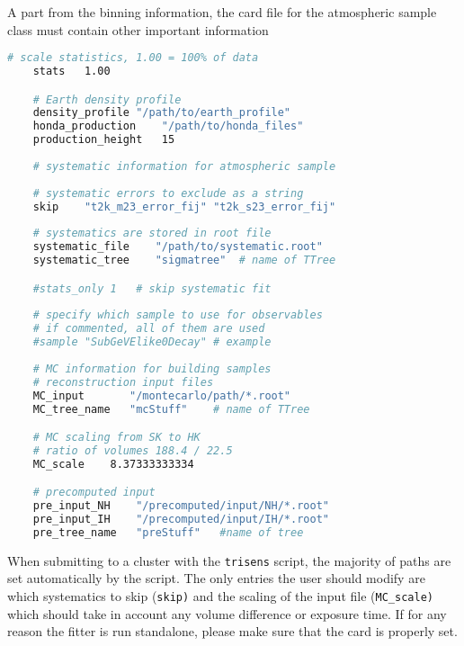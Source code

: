\documentclass[a4paper, 11pt]{article}
\begin{document}
A part from the binning information, the card file for the atmospheric sample class must contain other important information
\begin{lstlisting}[language=bash]
    # scale statistics, 1.00 = 100% of data
    stats	1.00

    # Earth density profile
    density_profile	"/path/to/earth_profile"
    honda_production	"/path/to/honda_files"
    production_height	15
    
    # systematic information for atmospheric sample
    
    # systematic errors to exclude as a string
    skip	"t2k_m23_error_fij" "t2k_s23_error_fij"
    
    # systematics are stored in root file
    systematic_file    "/path/to/systematic.root"
    systematic_tree    "sigmatree"	# name of TTree

    #stats_only	1	# skip systematic fit
    
    # specify which sample to use for observables
    # if commented, all of them are used
    #sample	"SubGeVElike0Decay"	# example
    
    # MC information for building samples
    # reconstruction input files
    MC_input	   "/montecarlo/path/*.root"
    MC_tree_name   "mcStuff"	# name of TTree

    # MC scaling from SK to HK
    # ratio of volumes 188.4 / 22.5
    MC_scale	8.37333333334

    # precomputed input
    pre_input_NH	"/precomputed/input/NH/*.root"
    pre_input_IH	"/precomputed/input/IH/*.root"
    pre_tree_name	"preStuff"   #name of tree
\end{lstlisting}
When submitting to a cluster with the \texttt{trisens} script, %
the majority of paths are set automatically by the script.
The only entries the user should modify are which systematics to skip (\texttt{skip)} %
and the scaling of the input file (\texttt{MC\_scale)} which should take in account any %
volume difference or exposure time.
If for any reason the fitter is run standalone, please make sure that the card is properly set.
\end{document}
